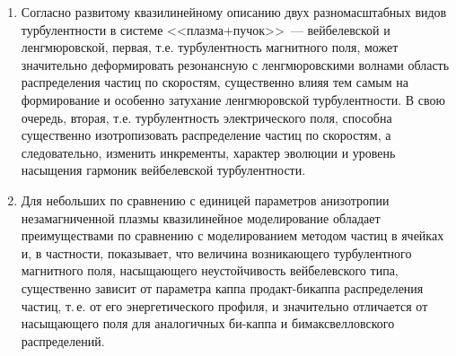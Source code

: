 \begin{enumerate}

    \item  Согласно развитому квазилинейному описанию двух разномасштабных видов турбулентности в системе <<плазма+пучок>>~--- вейбелевской и ленгмюровской, первая, т.е. турбулентность магнитного поля, может значительно деформировать резонансную с ленгмюровскими волнами область распределения частиц по скоростям, существенно влияя тем самым на формирование и особенно затухание ленгмюровской турбулентности. В свою очередь, вторая, т.е. турбулентность электрического поля, способна существенно изотропизовать распределение частиц по скоростям, а следовательно, изменить инкременты, характер эволюции и уровень насыщения гармоник вейбелевской турбулентности.
    
    \item Для небольших по сравнению с единицей параметров анизотропии незамагниченной плазмы квазилинейное моделирование обладает преимуществами по сравнению с моделированием методом частиц в ячейках и, в частности, показывает, что величина возникающего турбулентного магнитного поля, насыщающего неустойчивость вейбелевского типа, существенно зависит от параметра каппа продакт-бикаппа распределения частиц, т.\,е. от его энергетического профиля, и значительно отличается от насыщающего поля для аналогичных би-каппа и бимаксвелловского распределений.
    
\end{enumerate}

